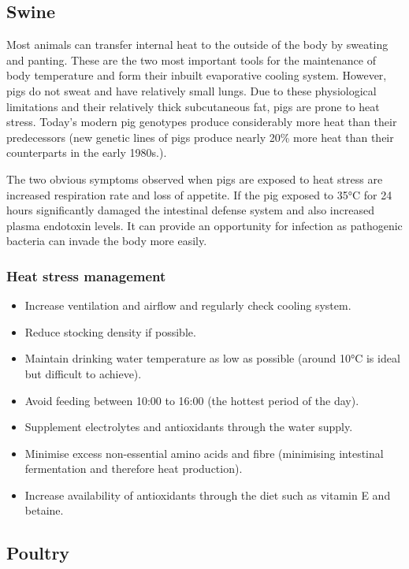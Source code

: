 \documentclass[]{book}
\providecommand{\tightlist}{%
  \setlength{\itemsep}{0pt}\setlength{\parskip}{0pt}}
\begin{document}
\subsection{Swine}\label{swine}

Most animals can transfer internal heat to the outside of the body by
sweating and panting. These are the two most important tools for the
maintenance of body temperature and form their inbuilt evaporative
cooling system. However, pigs do not sweat and have relatively small
lungs. Due to these physiological limitations and their relatively thick
subcutaneous fat, pigs are prone to heat stress. Today's modern pig
genotypes produce considerably more heat than their predecessors (new
genetic lines of pigs produce nearly 20\% more heat than their
counterparts in the early 1980s.).

The two obvious symptoms observed when pigs are exposed to heat stress
are increased respiration rate and loss of appetite. If the pig exposed
to 35°C for 24 hours significantly damaged the intestinal defense system
and also increased plasma endotoxin levels. It can provide an
opportunity for infection as pathogenic bacteria can invade the body
more easily.

\subsubsection{Heat stress management}\label{heat-stress-management-1}

\begin{itemize}
\tightlist
\item
  Increase ventilation and airflow and regularly check cooling system.
\item
  Reduce stocking density if possible.
\item
  Maintain drinking water temperature as low as possible (around 10°C is
  ideal but difficult to achieve).
\item
  Avoid feeding between 10:00 to 16:00 (the hottest period of the day).
\item
  Supplement electrolytes and antioxidants through the water supply.
\item
  Minimise excess non-essential amino acids and fibre (minimising
  intestinal fermentation and therefore heat production).
\item
  Increase availability of antioxidants through the diet such as vitamin
  E and betaine.
\end{itemize}

\subsection{Poultry}\label{poultry}
\end{document}
